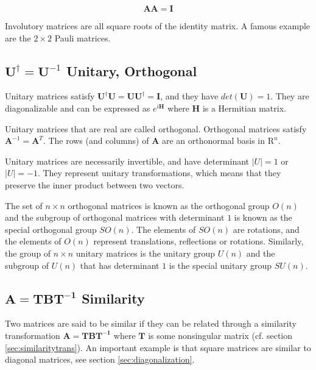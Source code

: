 \begin{equation}
\mathbf{A}\mathbf{A}=\mathbf{I}
\end{equation}

Involutory matrices are all square roots of the identity matrix. A famous example are the $2\times 2$ Pauli matrices. 




\subsection{$\mathbf{U}^{\dagger} = \mathbf{U}^{-1}$ Unitary, Orthogonal}
Unitary matrices satisfy $\mathbf{U}^{\dagger}\mathbf{U} = \mathbf{UU}^{\dagger}=\mathbf{I}$, and they have $det(\mathbf{U}) = 1$. They are diagonalizable and can be expressed as $e^{i\mathbf{H}}$ where $\mathbf{H}$ is a Hermitian matrix.

Unitary matrices that are real are called orthogonal.  Orthogonal matrices satisfy $\mathbf{A}^{-1} = \mathbf{A}^T$. The rows (and columns) of $\mathbf{A}$ are an orthonormal basis in $\mathrm{R}^n$.

Unitary matrices are necessarily invertible, and have determinant $|U|=1$ or $|U|=-1$. They represent unitary transformations, which means that they preserve the inner product between two vectors.

The set of $n \times n$ orthogonal matrices is known as the orthogonal group $O(n)$ and the subgroup of orthogonal matrices with determinant $1$ is known as the special orthogonal group $SO(n)$. The elements of $SO(n)$ are rotations, and the elements of $O(n)$ represent translations, reflections or rotations. Similarly, the group of $n \times n$ unitary matrices is the unitary group $U(n)$ and the subgroup of $U(n)$ that has determinant $1$ is the special unitary group $SU(n)$.



\subsection{$\mathbf{A} = \mathbf{TBT^{-1}}$ Similarity}
Two matrices are said to be similar if they can be related through a similarity transformation  $\mathbf{A} = \mathbf{TBT^{-1}}$ where $\mathbf{T}$ is some nonsingular matrix (cf. section \ref{sec:similaritytrans}). An important example is that square matrices are similar to diagonal matrices, see section \ref{sec:diagonalization}. 
   

